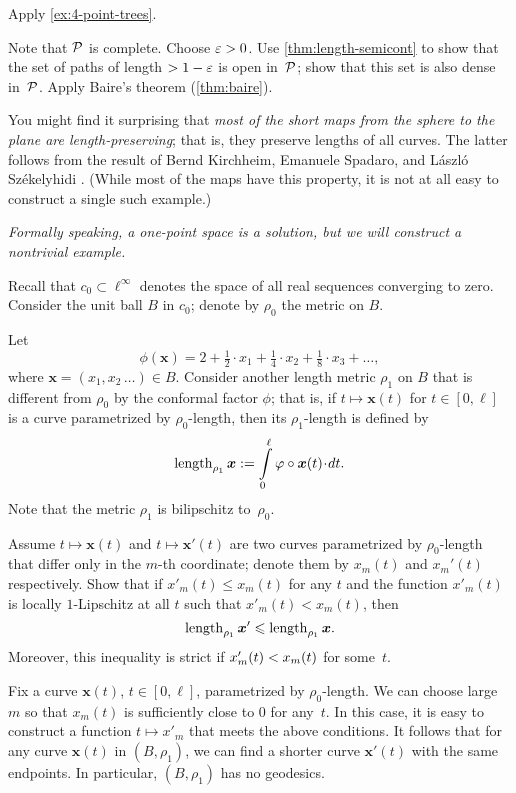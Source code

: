 Apply \ref{ex:4-point-trees}.

Note that $\mathcal{P}$ is complete.
Choose $\varepsilon>0$.
Use \ref{thm:length-semicont} to show that the set of paths of length $>1-\varepsilon$ is open in~$\mathcal{P}$;
show that this set is also dense in~$\mathcal{P}$.
Apply Baire's theorem (\ref{thm:baire}).

You might find it surprising that \textit{most of the short maps from the sphere to the plane are \emph{length-preserving}}; that is, they preserve lengths of all curves.
The latter follows from the result of 
Bernd Kirchheim, 
Emanuele Spadaro,
and 
L{\'a}szl{\'o} Sz{\'e}kelyhidi \cite{KSS}.
(While most of the maps have this property, it is not at all easy to construct a single such example.) 


\textit{Formally speaking, a one-point space is a solution,
but we will construct a nontrivial example.}

Recall that $c_0\subset\ell^\infty$ denotes the space of all real sequences converging to zero.
Consider the unit ball $B$ in $c_0$;
denote by $\rho_0$ the metric on $B$.

Let \[\phi(\bm{x})=2+\tfrac{1}2\cdot x_1+\tfrac{1}4\cdot x_2+\tfrac{1}8\cdot x_3+\dots,\]
where $\bm{x}=(x_1,x_2\,\dots)\in B$.
Consider another length metric $\rho_1$ on $B$ that is different from $\rho_0$ by the conformal factor $\phi$;
that is, if $t\mapsto\bm{x}(t)$ for $t\in[0,\ell]$ is a curve parametrized by $\rho_0$-length,
then its $\rho_1$-length is defined by
\[\length_{\rho_1}\bm{x}\df\int\limits_0^\ell\phi\circ\bm{x}(t)\cdot dt.\]
Note that the metric $\rho_1$ is bilipschitz to~$\rho_0$.

Assume $t\mapsto \bm{x}(t)$ and $t\mapsto \bm{x}'(t)$ are two curves parametrized by $\rho_0$-length that differ only in the $m$-th coordinate; denote them by $x_m(t)$ and $x_m'(t)$ respectively.
Show that if $x'_m(t)\le x_m(t)$ for any $t$ and 
the function $x'_m(t)$ is locally $1$-Lipschitz at all $t$ such that $x'_m(t)< x_m(t)$, then 
\[\mathop{\rm length}\nolimits_{\rho_1}\bm{x}'\leqslant \mathop{\rm length}\nolimits_{\rho_1}\bm{x}.\]
Moreover, this inequality is strict if $x'_m(t)\z< x_m(t)$ for some~$t$.

Fix a curve $\bm{x}(t)$, $t\in[0,\ell]$, parametrized by  $\rho_0$-length.
We can choose large $m$ so that $x_m(t)$ is sufficiently close to $0$ for any~$t$.
In this case, it is easy to construct a function $t\mapsto x'_m$ that meets the above conditions.
It follows that for any curve $\bm{x}(t)$ in $(B,\rho_1)$, we can find a shorter curve $\bm{x}'(t)$ with the same endpoints.
In particular, $(B,\rho_1)$ has no geodesics.

